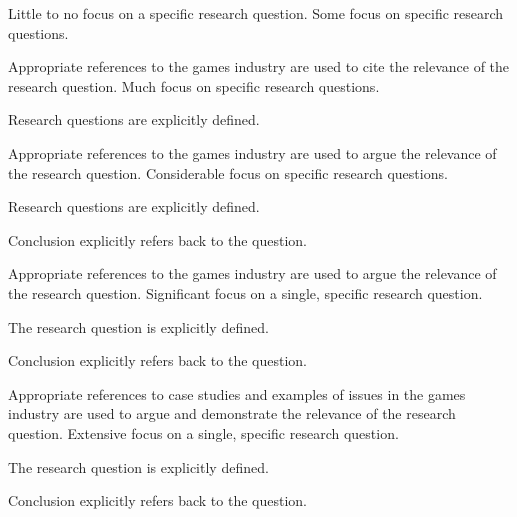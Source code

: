 \documentclass{../../fal_assignment}
\begin{document}
\begin{markingrubric}
%
%
        \grade  \fail	Little to no focus on a specific research question.
        \grade 		Some focus on specific research questions.
            \par 		Appropriate references to the games industry are used to cite the relevance of the research question.
        \grade 		Much focus on specific research questions.
            \par 		Research questions are explicitly defined.
            \par 		Appropriate references to the games industry are used to argue the relevance of the research question.
        \grade 		Considerable focus on specific research questions.
            \par 		Research questions are explicitly defined.
            \par 		Conclusion explicitly refers back to the question.
            \par 		Appropriate references to the games industry are used to argue the relevance of the research question.
        \grade 		Significant focus on a single, specific research question.
            \par 		The research question is explicitly defined.
            \par 		Conclusion explicitly refers back to the question.
            \par 		Appropriate references to case studies and examples of issues in the games industry are used to argue and demonstrate the relevance of the research question.
        \grade 		Extensive focus on a single, specific research question.
            \par 		The research question is explicitly defined.
            \par 		Conclusion explicitly refers back to the question.

\end{markingrubric}
\end{document}
